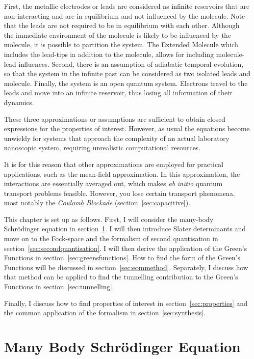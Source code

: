 First, the metallic electrodes or leads are considered as infinite reservoirs that are non\hyp{}interacting and are in equilibrium and not influenced by the molecule. Note that the leads are not required to be in equilibrium with each other. Although the immediate environment of the molecule is likely to be influenced by the molecule, it is possible to partition the system. The Extended Molecule which includes the lead-tips in addition to the molecule, allows for including  molecule-lead influences. Second, there is an assumption of adiabatic temporal evolution, so that the system in the infinite past can be considered as two isolated leads and molecule.  Finally, the system is an open quantum system. Electrons travel to the leads and move into an infinite reservoir, thus losing all information of their dynamics. 

These three approximations or assumptions are sufficient to obtain closed expressions for the properties of interest. However, as usual the equations become unwieldy for systems that approach the complexity of an actual laboratory nanoscopic system, requiring unrealistic computational resources.

It is for this reason that other approximations are employed for practical applications, such as the mean-field approximation. In this approximation, the interactions are essentially averaged out, which makes \emph{ab initio} quantum transport problems feasible. However, you lose certain transport phenomena, most notably the \emph{Coulomb Blockade} (section~\ref{sec:capacitive}).

This chapter is set up as follows. First, I will consider the many-body Schr\"odinger equation in section~\ref{sec:schrodinger}. I will then introduce Slater determinants and move on to the Fock-space and the formalism of second quantisation in section~\ref{sec:secondquantisation}. I will then derive the application of the Green's Functions in section~\ref{sec:greensfunctions}. How to find the form of the Green's Functions will be discussed in section~\ref{sec:eommethod}. Separately, I discuss how that method can be applied to find the tunnelling contribution to the Green's Functions in section~\ref{sec:tunnelling}.

Finally, I discuss how to find properties of interest in section~\ref{sec:properties} and the common application of the formalism in section~\ref{sec:synthesis}.

\section{Many Body Schr\"odinger Equation}
\label{sec:schrodinger}

